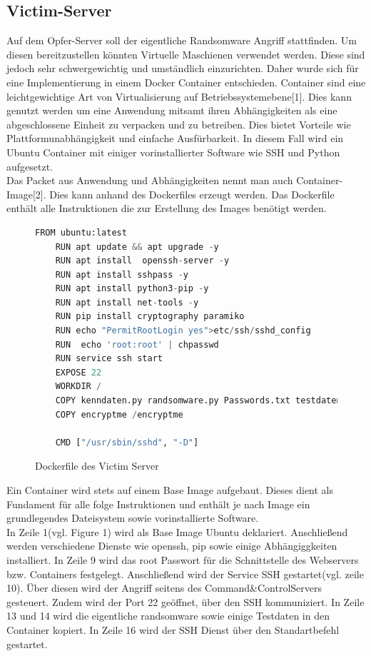 \documentclass[12pt]{article}
\begin{document}
\subsection{Victim-Server}
	Auf dem Opfer-Server soll der eigentliche Randsomware Angriff stattfinden. Um diesen bereitzustellen könnten Virtuelle Maschienen verwendet werden. Diese sind jedoch sehr schwergewichtig und umständlich einzurichten.
	Daher wurde sich für eine Implementierung in einem Docker Container entschieden.
	Container sind eine leichtgewichtige Art von Virtualisierung auf Betriebssystemebene[1]. Dies kann genutzt werden um eine Anwendung mitsamt ihren Abhängigkeiten als eine abgeschlossene Einheit zu verpacken und zu betreiben. Dies bietet Vorteile wie Plattformunabhängigkeit und einfache Ausfürbarkeit. In diesem Fall wird ein Ubuntu Container mit einiger vorinstallierter Software wie SSH und Python aufgesetzt.\\
	Das Packet aus Anwendung und Abhängigkeiten
	nennt man auch Container-Image[2]. Dies kann anhand des Dockerfiles erzeugt werden. Das Dockerfile enthält alle Instruktionen die zur Erstellung des Images benötigt werden.  
	\begin{figure}[h]
	\caption{Dockerfile des Victim Server}
	\begin{lstlisting}[language=python, style=code]
	FROM ubuntu:latest
	RUN apt update && apt upgrade -y 
	RUN apt install  openssh-server -y
	RUN apt install sshpass -y
	RUN apt install python3-pip -y 
	RUN apt install net-tools -y 
	RUN pip install cryptography paramiko
	RUN echo "PermitRootLogin yes">etc/ssh/sshd_config
	RUN  echo 'root:root' | chpasswd
	RUN service ssh start
	EXPOSE 22
	WORKDIR /
	COPY kenndaten.py randsomware.py Passwords.txt testdaten.txt /
	COPY encryptme /encryptme
	
	CMD ["/usr/sbin/sshd", "-D"]
		\end{lstlisting}
		
		\end{figure}
\newpage
Ein Container wird stets auf einem Base Image aufgebaut. Dieses dient als Fundament für alle folge Instruktionen und enthält je nach Image ein grundlegendes Dateisystem sowie vorinstallierte Software.\\
In Zeile 1(vgl. Figure 1) wird als Base Image Ubuntu deklariert. 
Anschließend werden verschiedene Dienste wie openssh, pip sowie einige Abhängiggkeiten installiert.
In Zeile 9 wird das root Passwort für die Schnittstelle des Webservers bzw. Containers festgelegt. Anschließend wird der Service SSH gestartet(vgl. zeile 10). Über diesen wird der Angriff seitens des Command\&Control\-Servers gesteuert. Zudem wird der Port 22 geöffnet, über den SSH kommuniziert. In Zeile 13 und 14 wird die eigentliche randsomware sowie einige Testdaten in den Container kopiert. In Zeile 16 wird der SSH Dienst über den Standartbefehl gestartet. \\
\end{document}
